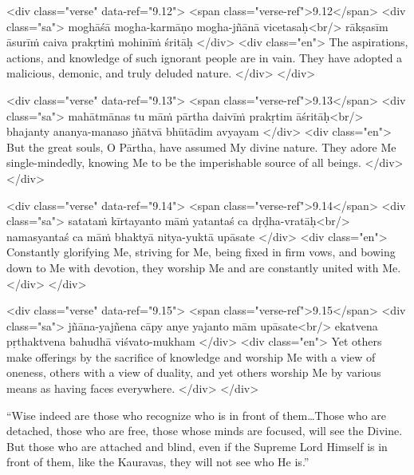 \begin{html}
<div class="verse" data-ref="9.12">
  <span class="verse-ref">9.12</span>
  <div class="sa">
    moghāśā mogha-karmāṇo mogha-jñānā vicetasaḥ<br/>
    rākṣasīm āsurīṁ caiva prakṛtiṁ mohinīṁ śritāḥ
  </div>
  <div class="en">
    The aspirations, actions, and knowledge of such ignorant people are in vain. They have adopted a malicious, demonic, and truly deluded nature.
  </div>
</div>
\end{html}



\begin{html}
<div class="verse" data-ref="9.13">
  <span class="verse-ref">9.13</span>
  <div class="sa">
    mahātmānas tu māṁ pārtha daivīṁ prakṛtim āśritāḥ<br/>
    bhajanty ananya-manaso jñātvā bhūtādim avyayam
  </div>
  <div class="en">
    But the great souls, O Pārtha, have assumed My divine nature. They adore Me single-mindedly, knowing Me to be the imperishable source of all beings.
  </div>
</div>
\end{html}



\begin{html}
<div class="verse" data-ref="9.14">
  <span class="verse-ref">9.14</span>
  <div class="sa">
    satataṁ kīrtayanto māṁ yatantaś ca dṛḍha-vratāḥ<br/>
    namasyantaś ca māṁ bhaktyā nitya-yuktā upāsate
  </div>
  <div class="en">
    Constantly glorifying Me, striving for Me, being fixed in firm vows, and bowing down to Me with devotion, they worship Me and are constantly united with Me.
  </div>
</div>
\end{html}



\begin{html}
<div class="verse" data-ref="9.15">
  <span class="verse-ref">9.15</span>
  <div class="sa">
    jñāna-yajñena cāpy anye yajanto mām upāsate<br/>
    ekatvena pṛthaktvena bahudhā viśvato-mukham
  </div>
  <div class="en">
    Yet others make offerings by the sacrifice of knowledge and worship Me with a view of oneness, others with a view of duality, and yet others worship Me by various means as having faces everywhere.
  </div>
</div>
\end{html}


\enquote{Wise indeed are those who recognize who is in front of them\ldots Those who are detached, those who are free, those whose minds are focused, will see the Divine. But those who are attached and blind, even if the Supreme Lord Himself is in front of them, like the Kauravas, they will not see who He is.}

